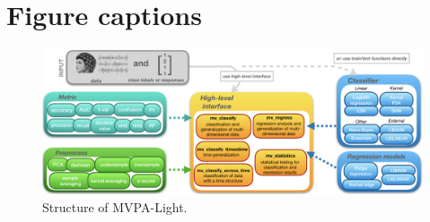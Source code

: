\documentclass[utf8]{frontiersSCNS} %
\begin{document}
\section*{Figure captions}



\begin{figure}[ht!]
\centering\includegraphics[width=\linewidth]{fig1_MVPA_structure}
\caption{Structure of MVPA-Light.}\label{fig:structure}
\end{figure}
\end{document}
